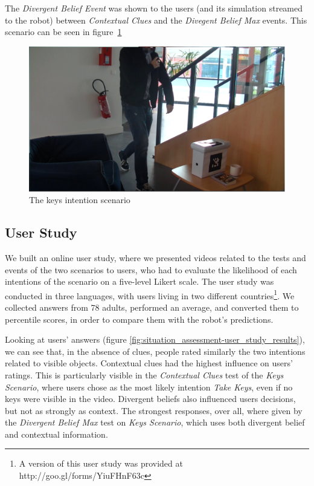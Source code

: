 The \textit{Divergent Belief Event} was shown to the users (and its simulation streamed to the robot) between \textit{Contextual Clues} and the \textit{Divegent Belief Max} events. This scenario can be seen in figure~\ref{fig:situation_assessment-keys}

 \begin{figure}[ht!]
	\centering
	\includegraphics[scale=0.5]{img/situation_assessment/keys2-blur.pdf}
	\caption{The keys intention scenario}
	\label{fig:situation_assessment-keys}
\end{figure}

\subsection{User Study}
We built an online user study, where we presented videos related to the tests and events of the two scenarios to users, who had to evaluate the likelihood of each intentions of the scenario
on a five-level Likert scale. The user study was conducted in three languages, with users living in two different countries\footnote{A version of this user study was provided at http://goo.gl/forms/YiuFHnF63c}. We collected answers from 78 adults, performed an average, and converted them to percentile scores, in order to compare them with the robot's predictions.

Looking at users' answers (figure \ref{fig:situation_assessment-user_study_results}), we can see that, in the absence of clues, people rated similarly the two intentions related to visible objects. Contextual clues had the highest influence on users' ratings. This is particularly visible in the \textit{Contextual Clues} test of the \textit{Keys Scenario}, where users chose as the most likely intention \textit{Take Keys}, even if no keys were visible in the video. Divergent beliefs also influenced users decisions, but not as strongly as context. The strongest responses, over all, where given by the \textit{Divergent Belief Max} test on \textit{Keys Scenario}, which uses both divergent belief and contextual information.

